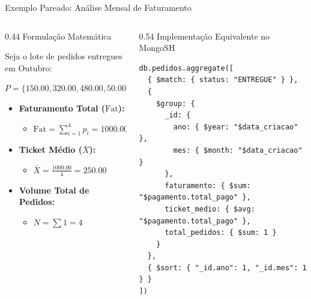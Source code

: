 \begin{frame}[fragile]{Exemplo Pareado: Análise Mensal de Faturamento}
  \vspace{0.05cm}
  \begin{columns}[t,onlytextwidth]
    \begin{column}{0.44\textwidth}
    	\alert{Formulação Matemática}\par
    	\vspace{0.2cm}
    	\scriptsize
    	Seja o lote de pedidos entregues em Outubro:
    	\begin{center}
    		$P = \{150.00, 320.00, 480.00, 50.00\}$
    	\end{center}
    	\begin{itemize}
    		\item \textbf{Faturamento Total ($\text{Fat}$):}
    		\begin{itemize}
    			\item[] $\text{Fat} = \sum_{i=1}^{4} p_i = 1000.00$
    		\end{itemize}
    		\item \textbf{Ticket Médio ($\bar{X}$):}
    		\begin{itemize}
    			\item[] $\bar{X} = \frac{1000.00}{4} = 250.00$
    		\end{itemize}
    		\item \textbf{Volume Total de Pedidos:}
    		\begin{itemize}
    			\item[] $N = \sum 1 = 4$
    		\end{itemize}
    	\end{itemize}
    \end{column}
    \begin{column}{0.54\textwidth}
      \alert{Implementação Equivalente no MongoSH}\par
      \vspace{0.05cm}
      \begin{lstlisting}[language=mongosh, basicstyle=\scriptsize\ttfamily]
db.pedidos.aggregate([
  { $match: { status: "ENTREGUE" } },
  {
    $group: {
      _id: {
        ano: { $year: "$data_criacao" },
        mes: { $month: "$data_criacao" }
      },
      faturamento: { $sum: "$pagamento.total_pago" },
      ticket_medio: { $avg: "$pagamento.total_pago" },
      total_pedidos: { $sum: 1 }
    }
  },
  { $sort: { "_id.ano": 1, "_id.mes": 1 } }
])
      \end{lstlisting}
    \end{column}
  \end{columns}
\end{frame}
